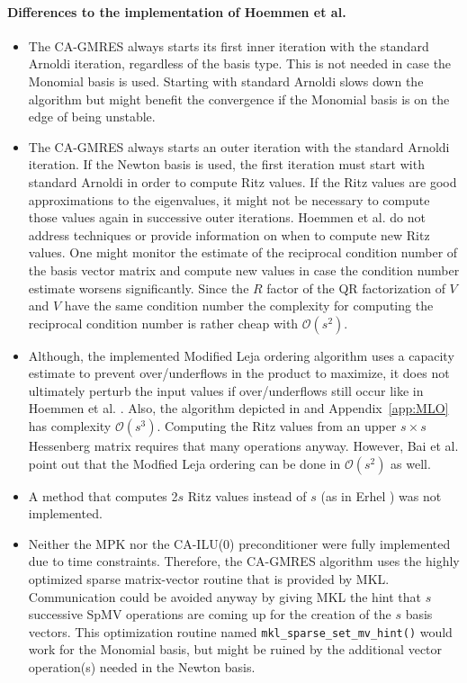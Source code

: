 \documentclass{scrartcl}
\numberwithin{equation}{section}
\begin{document}
\paragraph{Differences to the implementation of Hoemmen et al. \cite{Hoemmen:2010:CKS:1970638}}
\begin{itemize}
\item The CA-GMRES always starts its first inner iteration with the standard Arnoldi iteration, regardless of the basis type. This is not needed in case the Monomial basis is used. Starting with standard Arnoldi slows down the algorithm but might benefit the convergence if the Monomial basis is on the edge of being unstable.
\item The CA-GMRES always starts an outer iteration with the standard Arnoldi iteration. If the Newton basis is used, the first iteration must start with standard Arnoldi in order to compute Ritz values. If the Ritz values are good approximations to the eigenvalues, it might not be necessary to compute those values again in successive outer iterations. Hoemmen et al. \cite{Hoemmen:2010:CKS:1970638} do not address techniques or provide information on when to compute new Ritz values. One might monitor the estimate of the reciprocal condition number of the basis vector matrix and compute new values in case the condition number estimate worsens significantly. Since the $R$ factor of the QR factorization of $V$ and $V$ have the same condition number the complexity for computing the reciprocal condition number is rather cheap with $\mathcal{O}(s^2)$.
\item Although, the implemented Modified Leja ordering algorithm uses a capacity estimate to prevent over/underflows in the product to maximize, it does not ultimately perturb the input values if over/underflows still occur like in Hoemmen et al. \cite{Hoemmen:2010:CKS:1970638}. Also, the algorithm depicted in \cite{Hoemmen:2010:CKS:1970638} and Appendix~\ref{app:MLO} has complexity $\mathcal{O}(s^3)$. Computing the Ritz values from an upper $s \times s$ Hessenberg matrix requires that many operations anyway. However, Bai et al. \cite{NewtonGMRES_bai_reichel/doi:10.1093/imanum} point out that the Modfied Leja ordering can be done in $\mathcal{O}(s^2)$ as well.
\item A method that computes 2$s$ Ritz values instead of $s$ (as in Erhel \cite{Erhel95aparallel}) was not implemented.
\item Neither the MPK nor the CA-ILU(0) preconditioner were fully implemented due to time constraints. Therefore, the CA-GMRES algorithm uses the highly optimized sparse matrix-vector routine that is provided by MKL.  Communication could be avoided anyway by giving MKL the hint that $s$ successive SpMV operations are coming up for the creation of the $s$ basis vectors. This optimization routine named \texttt{mkl\_sparse\_set\_mv\_hint()} would work for the Monomial basis, but might be ruined by the additional vector operation(s) needed in the Newton basis.

\end{itemize}
\end{document}
